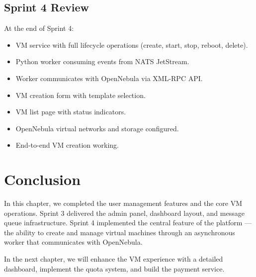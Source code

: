 \subsection{Sprint 4 Review}

At the end of Sprint 4:
\begin{itemize}
  \item VM service with full lifecycle operations (create, start, stop, reboot, delete).
  \item Python worker consuming events from NATS JetStream.
  \item Worker communicates with OpenNebula via XML-RPC API.
  \item VM creation form with template selection.
  \item VM list page with status indicators.
  \item OpenNebula virtual networks and storage configured.
  \item End-to-end VM creation working.
\end{itemize}

\section{Conclusion}

In this chapter, we completed the user management features and the core VM operations. Sprint 3 delivered the admin panel, dashboard layout, and message queue infrastructure. Sprint 4 implemented the central feature of the platform — the ability to create and manage virtual machines through an asynchronous worker that communicates with OpenNebula.

In the next chapter, we will enhance the VM experience with a detailed dashboard, implement the quota system, and build the payment service.
